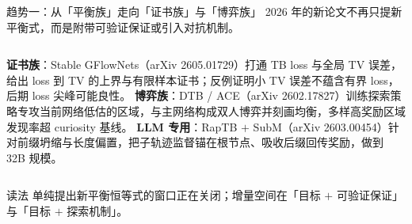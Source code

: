 \documentclass[aspectratio=169,10pt]{beamer}
\newcommand{\pos}[1]{\textcolor{positive}{#1}}
\begin{document}
\begin{frame}{趋势一：从「平衡族」走向「证书族」与「博弈族」}
  2026 年的新论文不再只提新平衡式，而是附带可验证保证或引入对抗机制。

  \vspace{6pt}
  \begin{columns}[T]
      \textbf{\pos{证书族}}：Stable GFlowNets（arXiv 2605.01729）打通 TB loss 与全局 TV 误差，给出 loss 到 TV 的上界与有限样本证书；反例证明小 TV 误差不蕴含有界 loss，后期 loss 尖峰可能良性。
      \textbf{\pos{博弈族}}：DTB / ACE（arXiv 2602.17827）训练探索策略专攻当前网络低估的区域，与主网络构成双人博弈并刻画均衡，多样高奖励区域发现率超 curiosity 基线。
      \textbf{\pos{LLM 专用}}：RapTB $+$ SubM（arXiv 2603.00454）针对前缀坍缩与长度偏置，把子轨迹监督锚在根节点、吸收后缀回传奖励，做到 32B 规模。
  \end{columns}

  \vspace{8pt}
  \begin{alertblock}{读法}
    单纯提出新平衡恒等式的窗口正在关闭；增量空间在「目标 $+$ 可验证保证」与「目标 $+$ 探索机制」。
  \end{alertblock}
\end{frame}
\end{document}

